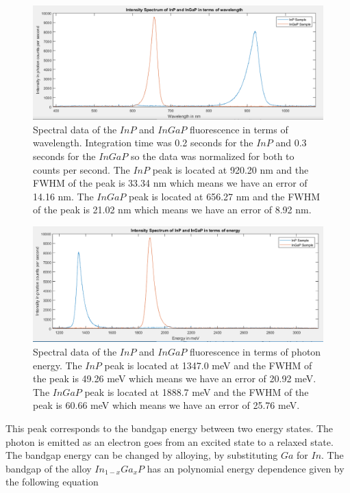 \documentclass{article}
\begin{document}
\begin{figure}[H]
\includegraphics[scale=.7,center]{ingapnm.PNG}
\caption{Spectral data of the $InP$ and $InGaP$ fluorescence in terms of wavelength.  Integration time was 0.2 seconds for the $InP$ and 0.3 seconds for the $InGaP$ so the data was normalized for both to counts per second.  The $InP$ peak is located at 920.20 nm and the FWHM of the peak is 33.34 nm which means we have an error of 14.16 nm.  The $InGaP$ peak is located at 656.27 nm and the FWHM of the peak is 21.02 nm which means we have an error of 8.92 nm.}
\end{figure}

\begin{figure}[H]
\includegraphics[scale=.7,center]{ingapev.PNG}
\caption{Spectral data of the $InP$ and $InGaP$ fluorescence in terms of photon energy.  The $InP$ peak is located at 1347.0 meV and the FWHM of the peak is 49.26 meV which means we have an error of 20.92 meV.  The $InGaP$ peak is located at 1888.7 meV and the FWHM of the peak is 60.66 meV which means we have an error of 25.76 meV.}
\end{figure}

This peak corresponds to the bandgap energy between two energy states.  The photon is emitted as an electron goes from an excited state to a relaxed state.  The bandgap energy can be changed by alloying, by substituting $Ga$ for $In$. The bandgap of the alloy $In_{1-x}Ga_{x}P$ has an polynomial energy dependence given by the following equation
\end{document}
